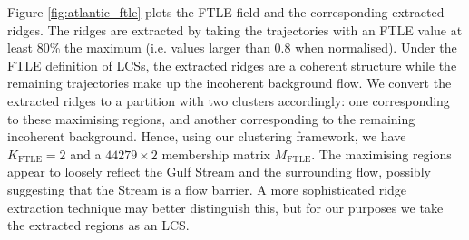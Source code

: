 \documentclass[a4paper, fontsize=12pt]{article}
\begin{document}
Figure \ref{fig:atlantic_ftle} plots the FTLE field and the corresponding extracted ridges. The ridges are extracted by taking the trajectories with an FTLE value at least 80\% the maximum (i.e. values larger than 0.8 when normalised). Under the FTLE definition of LCSs, the extracted ridges are a coherent structure while the remaining trajectories make up the incoherent background flow. We convert the extracted ridges to a partition with two clusters accordingly: one corresponding to these maximising regions, and another corresponding to the remaining incoherent background. Hence, using our clustering framework, we have \(K_{\text{FTLE}} = 2\) and a \(44279\times 2\) membership matrix \(M_{\text{FTLE}}\). The maximising regions appear to loosely reflect the Gulf Stream and the surrounding flow, possibly suggesting that the Stream is a flow barrier. A more sophisticated ridge extraction technique may better distinguish this, but for our purposes we take the extracted regions as an LCS.
\end{document}
